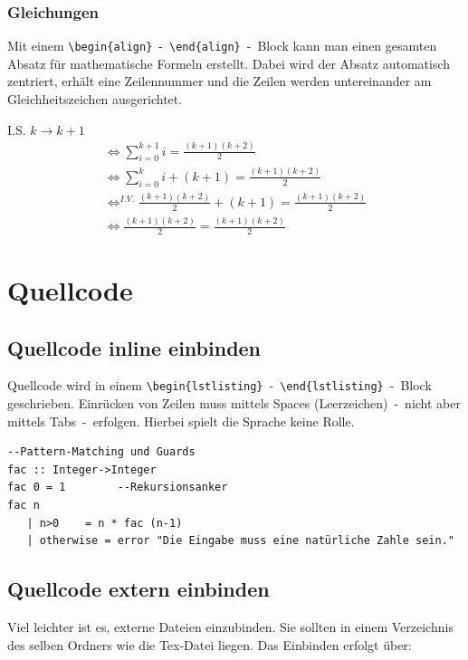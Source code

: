 \documentclass[
	10pt,
	parskip=half-,		%
	paper=a4,			%
	english, ngerman		%
	]{scrartcl}			%
\begin{document}
\subsubsection{Gleichungen}
Mit einem \verb|\begin{align}|~-~\verb|\end{align}|~-~Block kann man einen gesamten Absatz für mathematische Formeln erstellt. Dabei wird der Absatz automatisch zentriert, erhält eine Zeilennummer und die Zeilen werden untereinander am Gleichheitszeichen ausgerichtet.

I.S. $k \longrightarrow k+1$
\begin{align}
\Leftrightarrow \sum_{i=0}^{k+1}i = \frac{(k+1)(k+2)}{2} \\
\Leftrightarrow \sum_{i=0}^{k}i +(k+1) = \frac{(k+1)(k+2)}{2}\\
\Leftrightarrow^{I.V.} \frac{(k+1)(k+2)}{2} +(k+1) = \frac{(k+1)(k+2)}{2}\\
\Leftrightarrow \frac{(k+1)(k+2)}{2} = \frac{(k+1)(k+2)}{2}
\end{align}

\section{Quellcode}

\subsection{Quellcode inline einbinden}
Quellcode wird in einem \verb|\begin{lstlisting}|~-~\verb|\end{lstlisting}|~-~Block geschrieben. Einrücken von Zeilen muss mittels Spaces (Leerzeichen)~-~nicht aber mittels Tabs~-~erfolgen. Hierbei spielt die Sprache keine Rolle.

\begin{lstlisting}
--Pattern-Matching und Guards
fac :: Integer->Integer
fac 0 = 1        --Rekursionsanker
fac n
   | n>0	= n * fac (n-1)
   | otherwise = error "Die Eingabe muss eine natürliche Zahle sein."
\end{lstlisting}

\subsection{Quellcode extern einbinden}
Viel leichter ist es, externe Dateien einzubinden. Sie sollten in einem Verzeichnis des selben Ordners wie die Tex-Datei liegen. Das Einbinden erfolgt über:
\end{document}
